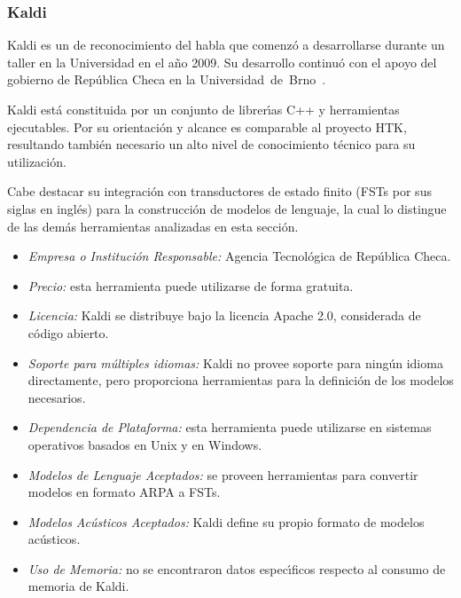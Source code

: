 \subsubsection{Kaldi}
\label{sec:kaldi}

Kaldi es un  de reconocimiento del habla que comenz\'o a desarrollarse durante un taller
en la Universidad  en el a\~no 2009. Su desarrollo continu\'o con el apoyo del gobierno
de Rep\'ublica Checa en la \mbox{Universidad de Brno \cite{Povey_ASRU2011}}.

Kaldi est\'a constituida por un conjunto de librer{\'\i}as C++ y herramientas ejecutables. Por su orientaci\'on y
alcance es comparable al proyecto HTK, resultando tambi\'en necesario un alto nivel de conocimiento t\'ecnico
para su utilizaci\'on.

Cabe destacar su integraci\'on con transductores de estado finito (FSTs por sus siglas en ingl\'es) para la
construcci\'on de modelos de lenguaje, la cual lo distingue de las dem\'as herramientas analizadas en esta secci\'on.

\begin{itemize}
	\item \emph{Empresa o Instituci\'on Responsable:} Agencia Tecnol\'ogica de Rep\'ublica Checa.
	\item \emph{Precio:} esta herramienta puede utilizarse de forma gratuita.
	\item \emph{Licencia:} Kaldi se distribuye bajo la licencia Apache 2.0, considerada de c\'odigo abierto.
	\item \emph{Soporte para m\'ultiples idiomas:} Kaldi no provee soporte para ning\'un
	idioma directamente, pero proporciona herramientas para la definici\'on de los modelos necesarios.
	\item \emph{Dependencia de Plataforma:} esta herramienta puede utilizarse en sistemas operativos
	basados en Unix y en Windows.
	\item \emph{Modelos de Lenguaje Aceptados:} se proveen herramientas para convertir modelos en formato
	ARPA a FSTs.
	\item \emph{Modelos Ac\'usticos Aceptados:} Kaldi define su propio formato de modelos ac\'usticos.
	\item \emph{Uso de Memoria:} no se encontraron datos espec{\'\i}ficos respecto al consumo de memoria
	de Kaldi.
\end{itemize}